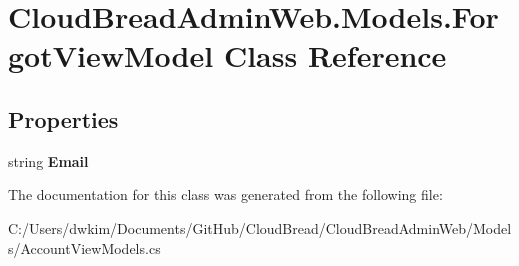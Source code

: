 \hypertarget{a00080}{}\section{Cloud\+Bread\+Admin\+Web.\+Models.\+Forgot\+View\+Model Class Reference}
\label{a00080}
\subsection*{Properties}
\begin{DoxyCompactItemize}
\item 
string {\bfseries Email}\hypertarget{a00080_a49217540654772a5e130cb60c6cd3959}{}\label{a00080_a49217540654772a5e130cb60c6cd3959}

\end{DoxyCompactItemize}


The documentation for this class was generated from the following file\+:\begin{DoxyCompactItemize}
\item 
C\+:/\+Users/dwkim/\+Documents/\+Git\+Hub/\+Cloud\+Bread/\+Cloud\+Bread\+Admin\+Web/\+Models/Account\+View\+Models.\+cs\end{DoxyCompactItemize}
